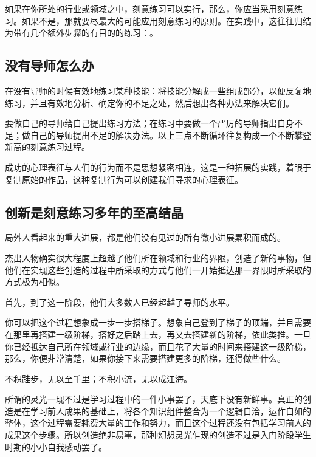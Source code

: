 \documentclass[12pt,oneside]{book}
\begin{document}
如果在你所处的行业或领域之中，刻意练习可以实行，那么，你应当采用刻意练习。如果不是，那就要尽最大的可能应用刻意练习的原则。在实践中，这往往归结为带有几个额外步骤的有目的的练习：。

\subsection{没有导师怎么办}
\begin{bookref}[frametitle={\cite{刻意练习}}]
在没有导师的时候有效地练习某种技能：将技能分解成一些组成部分，以便反复地练习，并且有效地分析、确定你的不足之处，然后想出各种办法来解决它们。
\end{bookref}

要做自己的导师给自己提出练习方法；在练习中要做一个严厉的导师指出自身不足；做自己的导师提出不足的解决办法。以上三点不断循环往复构成一个不断攀登新高的刻意练习过程。

成功的心理表征与人们的行为而不是思想紧密相连，这是一种拓展的实践，着眼于复制原始的作品，这种复制行为可以创建我们寻求的心理表征。

\subsection{创新是刻意练习多年的至高结晶}
\begin{bookref}[frametitle={\cite{刻意练习}}]
局外人看起来的重大进展，都是他们没有见过的所有微小进展累积而成的。

杰出人物确实很大程度上超越了他们所在领域和行业的界限，创造了新的事物，但他们在实现这些创造的过程中所采取的方式与他们一开始抵达那一界限时所采取的方式极为相似。

首先，到了这一阶段，他们大多数人已经超越了导师的水平。

你可以把这个过程想象成一步一步搭梯子。想象自己登到了梯子的顶端，并且需要在那里再搭建一级阶梯，搭好之后踏上去，再又去搭建新的阶梯，依此类推。一旦你已经抵达自己所在领域或行业的边缘，而且花了大量的时间来搭建这一级阶梯，那么，你便非常清楚，如果你接下来需要搭建更多的阶梯，还得做些什么。

不积跬步，无以至千里；不积小流，无以成江海。
\end{bookref}

所谓的灵光一现不过是学习过程中的一件小事罢了，天底下没有新鲜事。真正的创造是在学习前人成果的基础上，将各个知识组件整合为一个逻辑自洽，运作自如的整体，这个过程需要耗费大量的工作和努力，而且这个过程还没有包括学习前人的成果这个步骤。所以创造绝非易事，那种幻想灵光乍现的创造不过是入门阶段学生时期的小小自我感动罢了。
\end{document}
